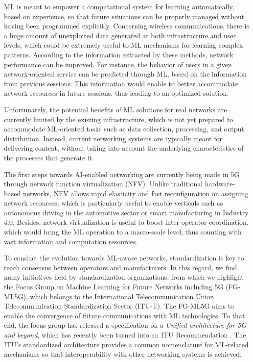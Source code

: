 \documentclass[journal]{IEEEtran}
\begin{document}
ML is meant to empower a computational system for learning automatically, based on experience, so that future situations can be properly managed without having been programmed explicitly. Concerning wireless communications, there is a huge amount of unexploited data generated at both infrastructure and user levels, which could be extremely useful to ML mechanisms for learning complex patterns. According to the information extracted by these methods, network performance can be improved. For instance, the behavior of users in a given network-oriented service can be predicted through ML, based on the information from previous sessions. This information would enable to better accommodate network resources in future sessions, thus leading to an optimized solution.

Unfortunately, the potential benefits of ML solutions for real networks are currently limited by the existing infrastructure, which is not yet prepared to accommodate ML-oriented tasks such as data collection, processing, and output distribution. Instead, current networking systems are typically meant for delivering content, without taking into account the underlying characteristics of the processes that generate it. 

The first steps towards AI-enabled networking are currently being made in 5G through network function virtualization (NFV). Unlike traditional hardware-based networks, NFV allows rapid elasticity and fast reconfiguration on assigning network resources, which is particularly useful to enable verticals such as autonomous driving in the automotive sector or smart manufacturing in Industry 4.0. Besides, network virtualization is useful to boost inter-operator coordination, which would bring the ML operation to a macro-scale level, thus counting with vast information and computation resources. 

To conduct the evolution towards ML-aware networks, standardization is key to reach consensus between operators and manufacturers. In this regard, we find many initiatives held by standardization organizations, from which we highlight the Focus Group on Machine Learning for Future Networks including 5G (FG-ML5G), which belongs to the International Telecommunication Union Telecommunication Standardization Sector (ITU-T). The FG-ML5G aims to enable the convergence of future communications with ML technologies. To that end, the focus group has released a specification on a \emph{Unified architecture for 5G and beyond}, which has recently been turned into an ITU Recommendation \cite{itu2019architecture}. The ITU's standardized architecture provides a common nomenclature for ML-related mechanisms so that interoperability with other networking systems is achieved. 
\end{document}
